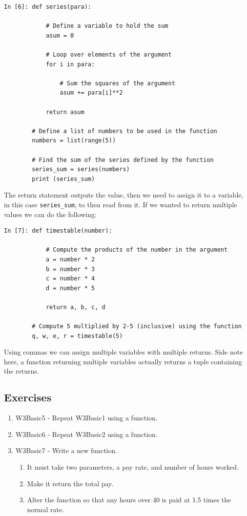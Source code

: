 \begin{lstlisting}[style=PY]
In [6]: def series(para):

            # Define a variable to hold the sum
            asum = 0
            
            # Loop over elements of the argument
            for i in para:
            
                # Sum the squares of the argument
                asum += para[i]**2
                
            return asum
	    
        # Define a list of numbers to be used in the function
        numbers = list(range(5))
        
        # Find the sum of the series defined by the function
        series_sum = series(numbers)
        print (series_sum)
\end{lstlisting}

The return statement outputs the value, then we need to assign it to a variable, in this case \texttt{series\_sum}, to then read from it. If we wanted to return multiple values we can do the following:
\begin{lstlisting}[style=PY]
In [7]: def timestable(number):

            # Compute the products of the number in the argument
            a = number * 2
            b = number * 3
            c = number * 4
            d = number * 5
            
            return a, b, c, d
	        
        # Compute 5 multiplied by 2-5 (inclusive) using the function
        q, w, e, r = timestable(5) 
\end{lstlisting}
Using commas we can assign multiple variables with multiple returns. Side note here, a function returning multiple variables actually returns a tuple containing the returns.

\subsection{Exercises}
\begin{enumerate}
    \item W3Basic5 - Repeat W3Basic1 using a function.
    \item W3Basic6 - Repeat W3Basic2 using a function.
    \item W3Basic7 - Write a new function.
    \begin{enumerate} 
        \item It must take two parameters, a pay rate, and number of hours worked.
        \item Make it return the total pay.
        \item Alter the function so that any hours over 40 is paid at 1.5 times the normal rate.
    \end{enumerate}
\end{enumerate}


